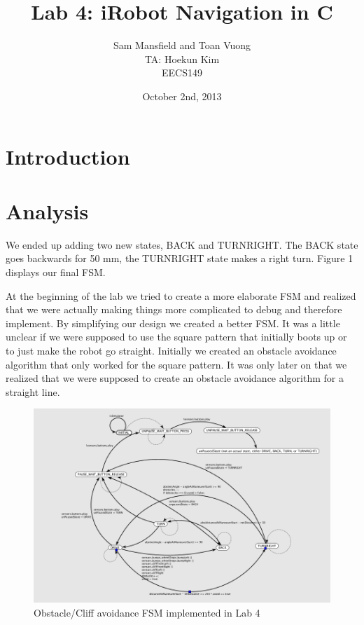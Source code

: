 \documentclass[10pt,titlepage]{article}
\begin{document}
  \title{Lab 4: iRobot Navigation in C}
  \author{Sam Mansfield and Toan Vuong\\
          TA: Hoekun Kim\\ 
          EECS149}
  \date{October 2nd, 2013}
  \maketitle

  \section{Introduction}

  \section{Analysis}
     
      We ended up adding two new states, BACK and TURNRIGHT. The BACK state goes backwards for 50 mm, the TURNRIGHT state makes a right turn. Figure 1 displays our final FSM.

      At the beginning of the lab we tried to create a more elaborate FSM and realized that we were actually making things more complicated to debug and therefore implement. By simplifying our design we created a better FSM. It was a little unclear if we were supposed to use the square pattern that initially boots up or to just make the robot go straight. Initially we created an obstacle avoidance algorithm that only worked for the square pattern. It was only later on that we realized that we were supposed to create an obstacle avoidance algorithm for a straight line.
    
    \begin{figure}[h!]
      \centering
        \includegraphics[width=1\textwidth]{../lab4_data/FSMLab4v2}
      \caption{Obstacle/Cliff avoidance FSM implemented in Lab 4}
    \end{figure}
\end{document}
